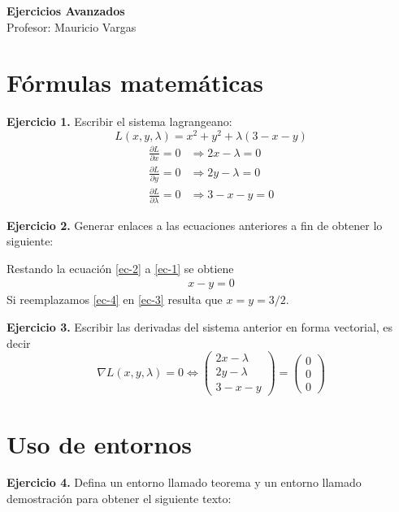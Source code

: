 \documentclass[oneside,spanish]{article}
\theoremstyle{definition}
\theoremstyle{definition}\newtheorem{definicion}{Definición}
\theoremstyle{definition}\newtheorem{ejemplo}{Ejemplo}
\theoremstyle{remark}\newtheorem{nota}{\textsc{Nota}}
\theoremstyle{definition}\newtheorem{proposicion}{Proposición}
\theoremstyle{definition}\newtheorem{problema}{Problema}
\newcommand{\dpr}[2]{\frac{\partial #1}{\partial #2}}
\begin{document}
\begin{center}
\textsf{\textbf{Ejercicios Avanzados}}\\
Profesor: Mauricio Vargas\\
\end{center}

\thispagestyle{fancy}

\section{F\'ormulas matem\'aticas}

\textbf{Ejercicio 1.} Escribir el sistema lagrangeano:
$$L(x,y,\lambda) = x^2+y^2 + \lambda (3 - x -y)$$
\begin{align}
\dpr{L}{x}=0 & \Longrightarrow 2x - \lambda = 0 \label{ec-1} \\
\dpr{L}{y}=0 & \Longrightarrow 2y - \lambda = 0 \label{ec-2} \\
\dpr{L}{\lambda} = 0 & \Longrightarrow 3 - x - y = 0 \label{ec-3}
\end{align}

\textbf{Ejercicio 2.} Generar enlaces a las ecuaciones anteriores a fin de obtener lo siguiente:

Restando la ecuaci\'on \eqref{ec-2} a \eqref{ec-1} se obtiene
\begin{gather}
x - y = 0 \label{ec-4} \tag{*}
\end{gather}
Si reemplazamos \eqref{ec-4} en \eqref{ec-3} resulta que $x=y=3/2$.

\textbf{Ejercicio 3.} Escribir las derivadas del sistema anterior en forma vectorial, es decir
$$\nabla L(x,y,\lambda) = 0 \Leftrightarrow 
\begin{pmatrix}
2x - \lambda \\ 2y - \lambda \\ 3 - x - y
\end{pmatrix} 
=
\begin{pmatrix}
0 \\ 0 \\0
\end{pmatrix}$$

\section{Uso de entornos}

\textbf{Ejercicio 4.} Defina un entorno llamado teorema y un entorno llamado demostraci\'on para obtener el siguiente texto:
\end{document}
